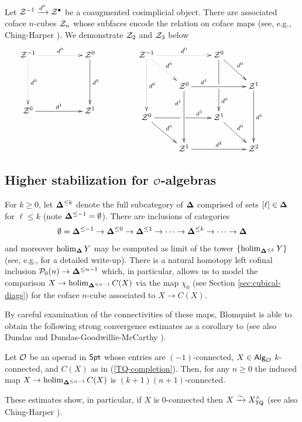 \begin{example}
    Let $\mathcal{Z}^{-1}\xrightarrow{d^0} \mathcal{Z}^{\bullet}$ be a coaugmented cosimplicial object. There are associated coface $n$-cubes $\mathcal{Z}_n$ whose subfaces encode the relation on coface maps (see, e.g.,  Ching-Harper \cite[]{Ching-Harper-Koszul}). We demonstrate $\mathcal{Z}_2$ and $\mathcal{Z}_3$ below \[ \xymatrix{ \Cal{Z}^{-1} \ar@{.>}[rr]^-{d^0} \ar@{.>}[dd]^-{d^0} && \Cal{Z}^0 \ar[dd]^-{d^0} \\ && \\ \Cal{Z}^0 \ar[rr]^-{d^1} && \Cal{Z}^1 }\hspace{1.5cm}
     \xymatrix{ 
     \Cal{Z}^{-1} \ar@{.>}[rr]^-{d^0} \ar@{.>}[dd]^-{d^0} \ar@{.>}[dr]^-{d^0} & & \Cal{Z}^0\ar[dr]^-{d^0} \ar[dd]|\hole^<(.7){d^0} && \\
     & \Cal{Z}^0\ar[rr]^<(.2){d^1} \ar[dd]_<(.2){d^1} && \Cal{Z}^1 \ar[dd]^-{d^1} \\
     \Cal{Z}^0 \ar[rr]|\hole^<(.7){d^1} \ar[dr]^-{d^0} && \Cal{Z}^1 \ar[dr]^-{d^0} & \\
     & \Cal{Z}^1 \ar[rr]^-{d^2} && \Cal{Z}^2 }\]
\end{example}

\subsection{Higher stabilization for $\mathcal{O}$-algebras}
\label{delta-leq-k}
For $k\geq 0$, let $\mathbf{\Delta}^{\leq k}$ denote the full subcategory of $\mathbf{\Delta}$ comprised of sets $[\ell]\in \mathbf{\Delta}$ for $\ell\leq k$ (note $\mathbf{\Delta}^{\leq -1}=\emptyset$). There are inclusions of categories \[\emptyset=\mathbf{\Delta}^{\leq -1} \to \mathbf{\Delta}^{\leq 0} \to \mathbf{\Delta}^{\leq 1} \to \dots \to \mathbf{\Delta}^{\leq k}\to \cdots \to \mathbf{\Delta}\] and moreover $\operatorname{holim}_{\mathbf{\Delta}} Y$ may be computed as limit of the tower $\{\operatorname{holim}_{\mathbf{\Delta}^{\leq k}} Y\}$ (see, e.g.,  \cite[]{Ching-Harper-Koszul} for a detailed write-up). There is a natural homotopy left cofinal inclusion  $\mathcal{P}_0(n)\to \mathbf{\Delta}^{\leq n-1}$ which, in particular, allows us to model the comparison $X\to \operatorname{holim}_{\mathbf{\Delta}^{\leq n-1}} C(X)$ via the map $\chi_0$ (see Section \ref{sec:cubical-diags}) for the coface $n$-cube associated to $X\to C(X)$. 

By careful examination of the connectivities of these maps, Blomquist is able to obtain the following strong convergence estimates as a corollary to \cite[7.1]{Blom} (see also Dundas \cite{Dundas-1} and Dundas-Goodwillie-McCarthy \cite{DGM}).

\begin{proposition}
\label{higher-stabilization}
    Let $\mathcal{O}$ be an operad in $\mathsf{Spt}$ whose entries are $(-1)$-connected, $X \in {\mathsf{Alg}_{\mathcal{O}}}$ $k$-connected, and $C(X)$ as in (\ref{TQ-completion}). Then, for any $n\geq 0$ the induced map $X\to \operatorname{holim}_{\mathbf{\Delta}^{\leq n-1}}C(X)$ is $(k+1)(n+1)$-connected.
\end{proposition}

These estimates show, in particular, if $X$ is $0$-connected then $X\xrightarrow{\sim} X_{\mathsf{TQ}}^{\wedge}$ (see also Ching-Harper \cite{Ching-Harper-BM}). 